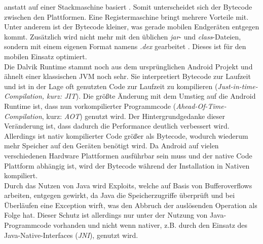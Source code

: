 	anstatt auf einer Stackmaschine basiert \cite{DalvikBytecode}. Somit
	unterscheidet sich der Bytecode zwischen den Plattformen. Eine
	Registermaschine bringt mehrere Vorteile mit. Unter anderem ist der Bytecode
	kleiner, was gerade mobilen Endgeräten entgegen kommt.
	Zusätzlich wird nicht mehr mit den üblichen \textit{jar}- und
	\textit{class}-Dateien, sondern mit einem eigenen Format namens \textit{.dex}
	gearbeitet \cite{DexFormat}. Dieses ist für den mobilen Einsatz optimiert.\\
	Die Dalvik Runtime stammt noch aus dem ursprünglichen Android Projekt und
	ähnelt einer klassischen JVM noch sehr. Sie interpretiert Bytecode zur
	Laufzeit und ist in der Lage oft genutzten Code zur Laufzeit zu kompilieren
	(\textit{Just-in-time-Compilation, kurz: JIT}).
	Die größte Änderung mit dem Umstieg auf die Android Runtime ist, dass nun
	vorkompilierter Programmcode (\textit{Ahead-Of-Time-Compilation}, kurz:
	\textit{AOT}) genutzt wird. Der Hintergrundgedanke dieser Veränderung ist,
	dass dadurch die Performance deutlich verbessert wird. Allerdings ist nativ
	kompilierter Code größer als Bytecode, wodurch wiederum mehr Speicher auf den
	Geräten benötigt wird. Da Android auf vielen verschiedenen Hardware
	Plattformen ausführbar sein muss und der native Code Plattform abhängig ist,
	wird der Bytecode während der Installation in Nativen kompiliert.\\
	Durch das Nutzen von Java wird Exploits, welche auf Basis von Bufferoverflows
	arbeiten, entgegen gewirkt, da Java die Speicherzugriffe überprüft und bei
	Überläufen eine Exception wirft, was den Abbruch der auslösenden Operation als
	Folge hat. Dieser Schutz ist allerdings nur unter der Nutzung von
	Java-Programmcode vorhanden und nicht wenn nativer, z.B. durch den Einsatz des
	Java-Native-Interfaces (\textit{JNI}), genutzt wird.
